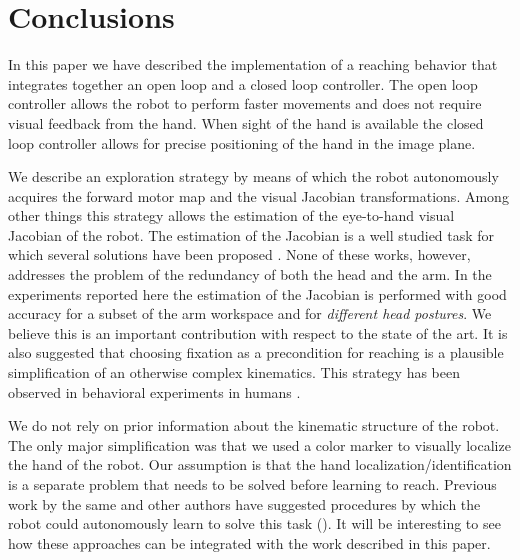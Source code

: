 \section{Conclusions}
In this paper we have described the implementation of a reaching
behavior that integrates together an open loop and a closed 
loop controller. The open loop controller
allows the robot to perform faster movements and does not require visual 
feedback from the hand. When sight of the hand is available the closed
loop controller allows for precise positioning of the hand in the 
image plane. 

We describe an exploration strategy by means of which the robot autonomously 
acquires the forward motor map and the visual Jacobian transformations. 
Among other things this strategy 
allows the estimation of the eye-to-hand visual Jacobian of the robot. 
The estimation of the Jacobian is a well studied task for which several 
solutions have been proposed \cite{Hosoda94versatile,Mansard06jacobian,
Lapreste04efficient}. None of these works, however, addresses the 
problem of the redundancy of both the head and the arm. In the experiments 
reported here the estimation of the Jacobian is performed with good 
accuracy for a subset of the arm workspace and for 
\emph{different head postures}. We believe
this is an important contribution with respect to the state of the art.
It is also suggested that choosing fixation as a precondition for reaching
is a plausible simplification of an otherwise complex kinematics. This 
strategy has been observed in behavioral experiments in humans 
\cite{flanders-daghestani-berthoz-1999}.

We do not rely on prior information about the 
kinematic structure of the robot. The only major simplification was that we used 
a color marker to visually localize the hand of the robot. Our assumption
is that the hand localization/identification is a separate problem
that needs to be solved before learning to reach. Previous work
by the same and other authors have suggested procedures by which 
the robot could autonomously learn to solve this task 
(\cite{Natale05,edsinger06what}). It will be interesting to see
how these approaches can be integrated with the work described 
in this paper.
